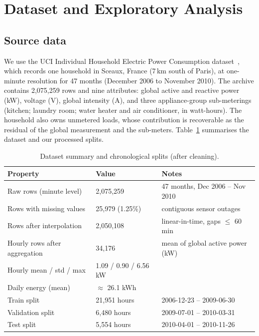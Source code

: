 \documentclass[10pt,a4paper]{article}
\begin{document}
\section{Dataset and Exploratory Analysis}\label{sec:data}

\subsection{Source data}
We use the UCI Individual Household Electric Power Consumption
dataset~\cite{hebrail2012uci}, which records one household in Sceaux, France (7\,km
south of Paris), at one-minute resolution for 47 months (December 2006 to November
2010). The archive contains 2{,}075{,}259 rows and nine attributes: global active and
reactive power (kW), voltage (V), global intensity (A), and three appliance-group
sub-meterings (kitchen; laundry room; water heater and air conditioner, in
watt-hours). The household also owns unmetered loads, whose contribution is recoverable
as the residual of the global measurement and the sub-meters. Table~\ref{tab:data}
summarises the dataset and our processed splits.

\begin{table}[t]
\centering
\caption{Dataset summary and chronological splits (after cleaning).}
\label{tab:data}
\small
\begin{tabular*}{\textwidth}{@{\extracolsep{\fill}} l l l}
\toprule
\textbf{Property} & \textbf{Value} & \textbf{Notes} \\
\midrule
Raw rows (minute level) & 2{,}075{,}259 & 47 months, Dec 2006 -- Nov 2010 \\
Rows with missing values & 25{,}979 (1.25\%) & contiguous sensor outages \\
Rows after interpolation & 2{,}050{,}108 & linear-in-time, gaps $\le$ 60 min \\
Hourly rows after aggregation & 34{,}176 & mean of global active power (kW) \\
Hourly mean / std / max & 1.09 / 0.90 / 6.56 kW & \\
Daily energy (mean) & $\approx$ 26.1 kWh & \\
\midrule
Train split & 21{,}951 hours & 2006-12-23 -- 2009-06-30 \\
Validation split & 6{,}480 hours & 2009-07-01 -- 2010-03-31 \\
Test split & 5{,}554 hours & 2010-04-01 -- 2010-11-26 \\
\bottomrule
\end{tabular*}
\end{table}
\end{document}
